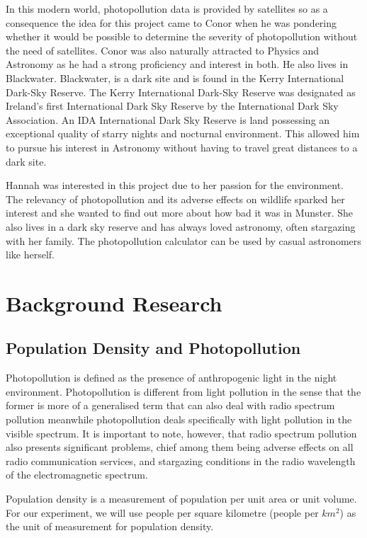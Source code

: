 In this modern world, photopollution data is provided by satellites so as a consequence the idea for this project came to Conor when he was pondering whether it would be possible to determine the severity of photopollution without the need of satellites. Conor was also naturally attracted to Physics and Astronomy as he had a strong proficiency and interest in both. He also lives in Blackwater. Blackwater, is a dark site and is found in the Kerry International Dark-Sky Reserve. The Kerry International Dark-Sky Reserve was designated as Ireland’s first International Dark Sky Reserve by the International Dark Sky Association.\cite{kds}
An IDA International Dark Sky Reserve is land possessing an exceptional quality of starry nights and nocturnal environment.\cite{ida}
This allowed him to pursue his interest in Astronomy without having to travel great distances to a dark site.

Hannah was interested in this project due to her passion for the environment. The relevancy of photopollution and its adverse effects on wildlife sparked her interest and she wanted to find out more about how bad it was in Munster. She also lives in a dark sky reserve and has always loved astronomy, often stargazing with her family. The photopollution calculator can be used by casual astronomers like herself.

\section{Background Research}
\subsection{Population Density and Photopollution}
Photopollution is defined as the presence of anthropogenic light in the night environment. Photopollution is different from light pollution in the sense that the former is more of a generalised term that can also deal with radio spectrum pollution meanwhile photopollution deals specifically with light pollution in the visible spectrum.\cite{photopollution}
It is important to note, however, that radio spectrum pollution also presents significant problems, chief among them being adverse effects on all radio communication services, and stargazing conditions in the radio wavelength of the electromagnetic spectrum.\cite{radiowave}

Population density is a measurement of population per unit area or unit volume.\cite{pdgeo}
For our experiment, we will use people per square kilometre (people per $km^2$) as the unit of measurement for population density.

